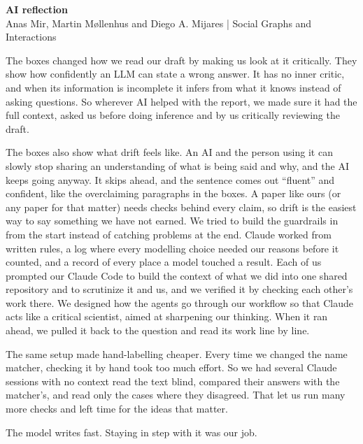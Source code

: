 \documentclass[11pt,a4paper]{article}
\begin{document}
{\large\bfseries AI reflection}\\[0.2em]
{\small Anas Mir, Martin M{\o}llenhus and Diego A. Mijares \quad| Social Graphs and Interactions}

\bigskip

The boxes changed how we read our draft by making us look at it critically. They show how confidently an LLM can
state a wrong answer. It has no inner critic, and when its information is incomplete it infers from what it knows
instead of asking questions. So wherever AI helped with the report, we made sure it had the full context, asked us
before doing inference and by us critically reviewing the draft.

The boxes also show what drift feels like. An AI and the person using it can slowly stop sharing an understanding of
what is being said and why, and the AI keeps going anyway. It skips ahead, and the sentence comes out ``fluent'' and
confident, like the overclaiming paragraphs in the boxes. A paper like ours (or any paper for that matter) needs
checks behind every claim, so drift is the easiest way to say something we have not earned. We tried to build the
guardrails in from the start instead of catching problems at the end. Claude worked from written rules, a log where
every modelling choice needed our reasons before it counted, and a record of every place a model touched a result.
Each of us prompted our Claude Code to build the context of what we did into one shared repository and to scrutinize
it and us, and we verified it by checking each other's work there. We designed how the agents go through our workflow
so that Claude acts like a critical scientist, aimed at sharpening our thinking. When it ran ahead, we pulled it back
to the question and read its work line by line.

The same setup made hand-labelling cheaper. Every time we changed the name matcher, checking it by hand took too much
effort. So we had several Claude sessions with no context read the text blind, compared their answers with the
matcher's, and read only the cases where they disagreed. That let us run many more checks and left time for the ideas
that matter.

The model writes fast. Staying in step with it was our job.
\end{document}
